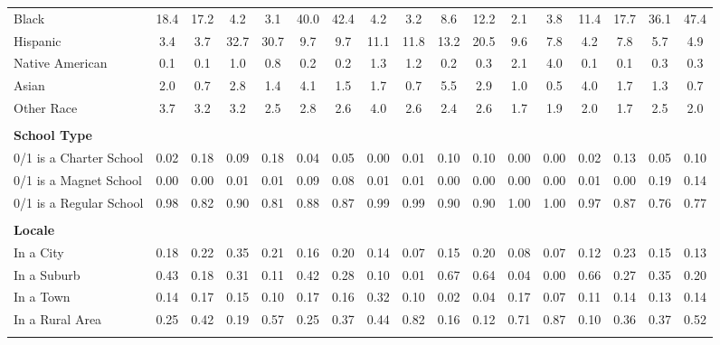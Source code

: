 \begin{tabular*}{\linewidth}{@{\extracolsep{\fill} } lcccccccccccccccc}
\hspace{0.2cm}Black&18.4&17.2&4.2&3.1&40.0&42.4&4.2&3.2&8.6&12.2&2.1&3.8&11.4&17.7&36.1&47.4\\%
\hspace{0.2cm}Hispanic&3.4&3.7&32.7&30.7&9.7&9.7&11.1&11.8&13.2&20.5&9.6&7.8&4.2&7.8&5.7&4.9\\%
\hspace{0.2cm}Native American&0.1&0.1&1.0&0.8&0.2&0.2&1.3&1.2&0.2&0.3&2.1&4.0&0.1&0.1&0.3&0.3\\%
\hspace{0.2cm}Asian&2.0&0.7&2.8&1.4&4.1&1.5&1.7&0.7&5.5&2.9&1.0&0.5&4.0&1.7&1.3&0.7\\%
\hspace{0.2cm}Other Race&3.7&3.2&3.2&2.5&2.8&2.6&4.0&2.6&2.4&2.6&1.7&1.9&2.0&1.7&2.5&2.0\\%
&&&&&&&&&&&&&&&&\\%
\multicolumn{17}{l}{\bfseries School Type}\\%
\hspace{0.2cm}0/1 is a Charter School&0.02&0.18&0.09&0.18&0.04&0.05&0.00&0.01&0.10&0.10&0.00&0.00&0.02&0.13&0.05&0.10\\%
\hspace{0.2cm}0/1 is a Magnet School&0.00&0.00&0.01&0.01&0.09&0.08&0.01&0.01&0.00&0.00&0.00&0.00&0.01&0.00&0.19&0.14\\%
\hspace{0.2cm}0/1 is a Regular School&0.98&0.82&0.90&0.81&0.88&0.87&0.99&0.99&0.90&0.90&1.00&1.00&0.97&0.87&0.76&0.77\\%
&&&&&&&&&&&&&&&&\\%
\multicolumn{17}{l}{\bfseries Locale}\\%
\hspace{0.2cm}In a City&0.18&0.22&0.35&0.21&0.16&0.20&0.14&0.07&0.15&0.20&0.08&0.07&0.12&0.23&0.15&0.13\\%
\hspace{0.2cm}In a Suburb&0.43&0.18&0.31&0.11&0.42&0.28&0.10&0.01&0.67&0.64&0.04&0.00&0.66&0.27&0.35&0.20\\%
\hspace{0.2cm}In a Town&0.14&0.17&0.15&0.10&0.17&0.16&0.32&0.10&0.02&0.04&0.17&0.07&0.11&0.14&0.13&0.14\\%
\hspace{0.2cm}In a Rural Area&0.25&0.42&0.19&0.57&0.25&0.37&0.44&0.82&0.16&0.12&0.71&0.87&0.10&0.36&0.37&0.52\\%
&&&&&&&&&&&&&&&&\\%
\hline%
\end{tabular*}